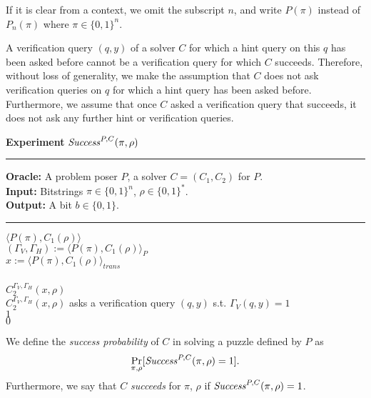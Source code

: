 %
If it is clear from a context, we omit the subscript $n$, and write $P(\pi)$ instead of $P_n(\pi)$ where $\pi \in \{0,1\}^{n}$.

A verification query $(q,y)$ of a solver $C$ for which a hint query on this $q$ has been asked before cannot be a verification query for which $C$ succeeds.
Therefore, without loss of generality, we make the assumption that $C$ does not ask verification queries on $q$
for which a hint query has been asked before. Furthermore, we assume that once $C$ asked a verification query that succeeds,
it does not ask any further hint or verification queries.

%
\begin{codeblock}
  \textbf{Experiment} $\operatorname{\mathit{Success}}^{P, C}(\pi, \rho)$
  \medskip \hrule 
  \textbf{Oracle:} A problem poser $P$, a solver $C = (C_1, C_2)$ for $P$.\\
  \textbf{Input:}  Bitstrings $\pi \in \{0,1\}^n$, $\rho \in \{0,1\}^*$.\\
  \textbf{Output:} A bit $b \in \{0,1\}$.
  \medskip\hrule\medskip
  \Run $\langle P(\pi), C_1(\rho) \rangle$ \\
  \IndI $(\Gamma_V, \Gamma_H) := \langle P(\pi), C_1(\rho) \rangle_{P}$ \\
  \IndI $x := \langle P(\pi), C_1(\rho) \rangle_{\mathit{trans}}$ \\ \\
  \Run $C_2^{\Gamma_V,\Gamma_H}(x, \rho)$ \\
  \IndI \If $C_2^{\Gamma_V, \Gamma_H}(x, \rho)$ asks a verification query $(q, y)$ s.t. $\Gamma_V(q, y) = 1$ \Then \\
  \IndII \Return $1$ \\
  \Return $0$ \\
\end{codeblock}
%
We define the \textit{success probability} of $C$ in solving a puzzle defined by $P$ as
\begin{align}
 \underset{\pi, \rho}{\Pr}[\operatorname{\mathit{Success}}^{P,C}(\pi, \rho) = 1].
\end{align}
Furthermore, we say that $C$ \textit{succeeds} for $\pi$, $\rho$ if $\operatorname{\mathit{Success}}^{P,C}(\pi, \rho) = 1$.
%
